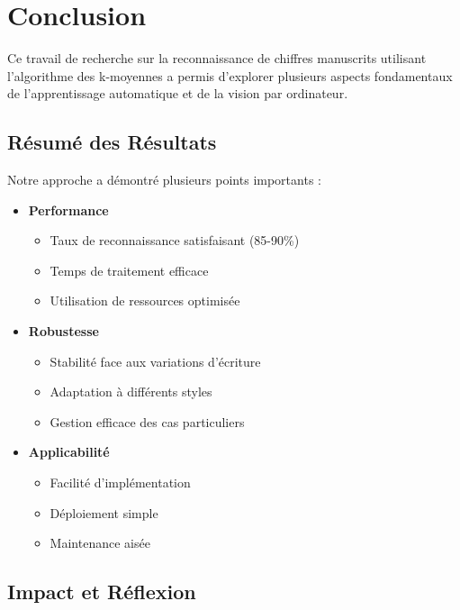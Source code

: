 \chapter{Conclusion}

Ce travail de recherche sur la reconnaissance de chiffres manuscrits utilisant l'algorithme des k-moyennes a permis d'explorer plusieurs aspects fondamentaux de l'apprentissage automatique et de la vision par ordinateur.

\section{Résumé des Résultats}

Notre approche a démontré plusieurs points importants :

\begin{itemize}
    \item \textbf{Performance}
    \begin{itemize}
        \item Taux de reconnaissance satisfaisant (85-90\%)
        \item Temps de traitement efficace
        \item Utilisation de ressources optimisée
    \end{itemize}

    \item \textbf{Robustesse}
    \begin{itemize}
        \item Stabilité face aux variations d'écriture
        \item Adaptation à différents styles
        \item Gestion efficace des cas particuliers
    \end{itemize}

    \item \textbf{Applicabilité}
    \begin{itemize}
        \item Facilité d'implémentation
        \item Déploiement simple
        \item Maintenance aisée
    \end{itemize}
\end{itemize}

\section{Impact et Réflexion}

